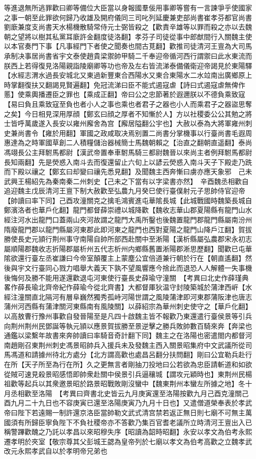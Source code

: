 等進退無所逃罪歡曰卿等備位大臣當以身報國羣佞用事卿等嘗有一言諫爭乎使國家之事一朝至此罪欲何歸乃收雄及開府儀同三司叱列延慶兼吏部尚書崔孝芬都官尚書劉廞兼度支尚書天水楊機散騎常侍元士弼皆殺之【歡責辛雄等以罪而殺之亦以去魏朝之望將以樹其私黨耳廞許金翻度徒洛翻】孝芬子司徒從事中郎猷間行入關魏主使以本官奏門下事【凡事經門下者使之聞奏也間古莧翻】歡推司徒清河王亶為大司馬承制决事居尚書省宇文泰使趙貴梁禦帥甲騎二千奉迎帝循河西行謂禦曰此水東流而朕西上若得復見洛陽親詣陵廟卿等功也帝及左右皆流涕泰備儀衛迎帝謁見於東陽驛【水經志渭水過長安城北又東過新豐東合西陽水又東合東陽水二水竝南出廣鄉原上時掌翻復扶又翻謁見賢遍翻】免冠流涕曰臣不能式遏寇虐【詩曰式遏寇虐無俾作慝】使乘輿播遷臣之罪也【乘成正翻】帝曰公之忠節著於遐邇朕以不德負乘致寇【易曰負且乘致寇至負也者小人之事也乘也者君子之器也小人而乘君子之器盜思奪之矣】今日相見深用厚顔【鄭玄曰顔之厚者不知慚於人】方以社稷委公公其勉之將士皆呼萬歲遂入長安以雍州廨舍為宫【廨居隘翻公宇也】大赦以泰為大將軍雍州刺史兼尚書令【雍於用翻】軍國之政咸取决焉别置二尚書分掌機事以行臺尚書毛遐周惠達為之時軍國草創二人積糧儲治器械簡士馬魏朝賴之【治直之翻朝直遥翻】泰尚馮翊長公主拜駙馬都尉【漢武帝置奉車駙馬騎三都尉魏晉以來尚主者例拜駙馬都尉長知兩翻】先是熒惑入南斗去而復還留止六旬上以諺云熒惑入南斗天子下殿走乃跣而下殿以禳之【鄭玄曰却變曰禳先悉見翻】及聞魏主西奔慚曰虜亦應天象邪　己未武興王楊紹先為秦南秦二州刺史【己未之下當有以字梁書亦然】　辛酉魏丞相歡自追迎魏主戊辰清河王亶下制大赦歡至弘農九月癸巳使行臺僕射元子思帥侍官迎帝【帥讀曰率下同】己酉攻潼關克之擒毛鴻賓進屯華隂長城【此城戰國時魏築長城自鄭濱洛者也華戶化翻】龍門都督薛崇禮以城降歡【魏收志華山郡夏陽縣有龍門山水經注河水出龍門口蓋兩山夾河故謂之龍門大禹所鑿也後魏置龍門郡龍門縣屬南汾州隋廢龍門郡以龍門縣屬河東郡此即河東之龍門也西對夏陽之龍門山降戶江翻】賀拔勝使長史元頴行荆州事守南陽自帥所部西赴關中至淅陽【漢析縣屬弘農郡宋永初志屬順陽郡魏收志折陽郡屬析州五代志析州内鄉縣舊置淅陽郡淅思歷翻】聞歡已屯華隂欲還行臺左丞崔謙曰今帝室顛覆主上蒙塵公宜倍道兼行朝於行在【朝直遙翻】然後與宇文行臺同心戮力唱舉大義天下孰不望風響應今捨此而退恐人人解體一失事機後悔何及勝不能用遂還歡退屯河東使行臺長史薛瑜守潼關　【考異曰北史作薛瑾典畧作薛長瑜北齊帝紀作薛瑜今從北齊書】大都督厙狄温守封陵築城於蒲津西㟁【水經注潼關直北隔河有層阜巍然獨秀孤峙河陽世謂之風陵蒲津即河東郡蒲阪津也唐志蒲州河西縣有蒲津關河東縣南有風陵關】以薛紹宗為華州刺史使守之【華戶化翻】以高敖曹行豫州事歡自發晉陽至是凡四十啟魏主皆不報歡乃東還遣行臺侯景等引兵向荆州荆州民鄧誕等執元頴以應景賀拔勝至景逆擊之勝兵敗帥數百騎來奔【奔梁也通鑑以梁繫年故書來奔帥讀曰率騎音奇計翻下同】魏主之在洛陽也密遣閤内都督河南趙剛召東荆州刺史馮景昭帥兵入援兵未及發魏主西入關景昭集府中文武議所從司馬馮道和請據州待北方處分【北方謂高歡也處昌呂翻分扶問翻】剛曰公宜勒兵赴行在所【天子所至為行在所】久之更無言者剛抽刀投地曰公若欲為忠臣請斬道和如欲從賊可速見殺景昭感悟即帥衆赴關中侯景引兵逼穰城【謂攻元穎時也】東荆州民楊祖歡等起兵以其衆邀景昭於路景昭戰敗剛沒蠻中【魏東荆州本蠻左所據之地】冬十月丞相歡至洛陽　【考異曰齊書北史皆云九月庚寅還至洛陽按歡九月己酉克潼關己酉九月二十九日也不容庚寅已還至洛陽庚寅乃九月十日也】又遣僧道榮奉表於孝武帝曰陛下若遠賜一制許還京洛臣當帥勒文武式清宫禁若返正無日則七廟不可無主萬國須有所歸臣寧負陛下不負社稷帝亦不答歡乃集百官耆老議所立時清河王亶出入已稱警蹕歡醜之乃託以孝昌以來昭穆失序【昭讀為韶時昭翻】永安以孝文為伯考永熙遷孝明於夾室【敬宗尊其父彭城王勰為皇帝列於七廟以孝文為伯考高歡之立魏孝武改元永熙孝武自以於孝明帝兄弟也